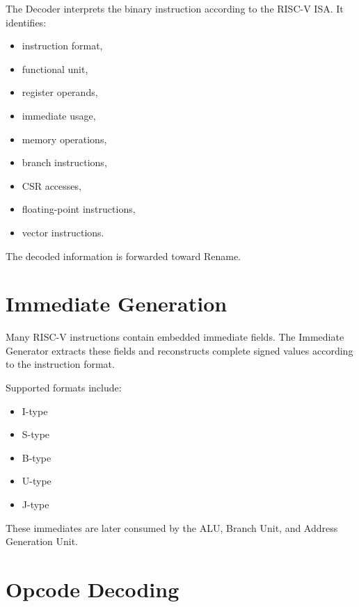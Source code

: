 The Decoder interprets the binary instruction according to the RISC-V ISA.
It identifies:
\begin{itemize}
  \item instruction format,
  \item functional unit,
  \item register operands,
  \item immediate usage,
  \item memory operations,
  \item branch instructions,
  \item CSR accesses,
  \item floating-point instructions,
  \item vector instructions.
\end{itemize}

The decoded information is forwarded toward Rename.

\begin{rtlrefs}
\end{rtlrefs}

\section{Immediate Generation}

Many RISC-V instructions contain embedded immediate fields.
The Immediate Generator extracts these fields and reconstructs complete signed values
according to the instruction format.

Supported formats include:
\begin{itemize}
  \item I-type
  \item S-type
  \item B-type
  \item U-type
  \item J-type
\end{itemize}

These immediates are later consumed by the ALU, Branch Unit, and Address Generation Unit.

\begin{rtlrefs}
\end{rtlrefs}

\section{Opcode Decoding}

